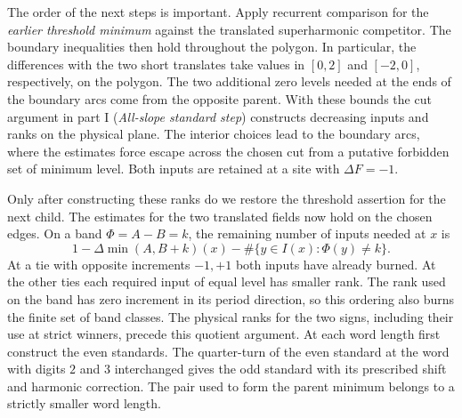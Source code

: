 The order of the next steps is important. Apply recurrent comparison for the \emph{earlier threshold minimum} against the translated superharmonic competitor. The boundary inequalities then hold throughout the polygon. In particular, the differences with the two short translates take values in $[0,2]$ and $[-2,0]$, respectively, on the polygon. The two additional zero levels needed at the ends of the boundary arcs come from the opposite parent. With these bounds the cut argument in part I (\emph{All-slope standard step}) constructs decreasing inputs and ranks on the physical plane. The interior choices lead to the boundary arcs, where the estimates force escape across the chosen cut from a putative forbidden set of minimum level. Both inputs are retained at a site with $\Delta F=-1$.

Only after constructing these ranks do we restore the threshold assertion for the next child. The estimates for the two translated fields now hold on the chosen edges. On a band $\Phi=A-B=k$, the remaining number of inputs needed at $x$ is
\[
  1-\Delta\min(A,B+k)(x)-\#\{y\in I(x):\Phi(y)\ne k\}.
\]
At a tie with opposite increments $-1,+1$ both inputs have already burned. At the other ties each required input of equal level has smaller rank. The rank used on the band has zero increment in its period direction, so this ordering also burns the finite set of band classes. The physical ranks for the two signs, including their use at strict winners, precede this quotient argument. At each word length first construct the even standards. The quarter-turn of the even standard at the word with digits $2$ and $3$ interchanged gives the odd standard with its prescribed shift and harmonic correction. The pair used to form the parent minimum belongs to a strictly smaller word length.


